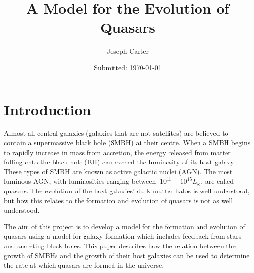 \documentclass[12pt, twocolumn]{report}%
\begin{document}
                     

\title{A Model for the Evolution of Quasars} 
\date{Submitted: \today{}}
\author{Joseph Carter}

 



\maketitle
\onecolumngrid


\tableofcontents
\newpage
\twocolumngrid


\section{Introduction}

Almost all central galaxies (galaxies that are not satellites) are believed to contain a supermassive black hole (SMBH) at their centre. When a SMBH begins to rapidly increase in mass from accretion, the energy released from matter falling onto the black hole (BH) can exceed the luminosity of its host galaxy. These types of SMBH are known as active galactic nuclei (AGN). The most luminous AGN, with luminosities ranging between $~10^{11} - 10^{15}L_\odot$, are called quasars. The evolution of the host galaxies' dark matter halos is well understood, but how this relates to the formation and evolution of quasars is not as well understood.\par

The aim of this project is to develop a model for the formation and evolution of quasars using a model for galaxy formation which includes feedback from stars and accreting black holes. This paper describes how the relation between the growth of SMBHs and the growth of their host galaxies can be used to determine the rate at which quasars are formed in the universe.
\end{document}
